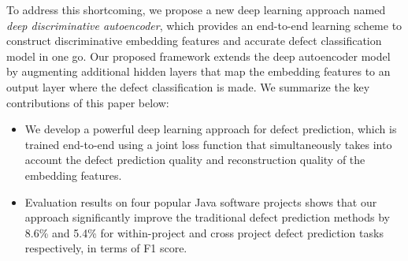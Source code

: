 To address this shortcoming, we propose a new deep learning approach named \emph{deep discriminative autoencoder}, which provides an end-to-end learning scheme to construct discriminative embedding features and accurate defect classification model in one go. Our proposed framework extends the deep autoencoder model~\cite{ng2011sparse} by augmenting additional hidden layers that map the embedding features to an output layer where the defect classification is made.
We summarize the key contributions of this paper below:
\begin{itemize}
	\item We develop a powerful deep learning approach for defect prediction, which is trained end-to-end using a joint loss function that simultaneously takes into account the defect prediction quality and reconstruction quality of the embedding features.
	\item Evaluation results on four popular Java software projects shows that our approach significantly improve the traditional defect prediction methods by 8.6\% and 5.4\% for within-project and cross project defect prediction tasks respectively, in terms of F1 score. 
\end{itemize}


